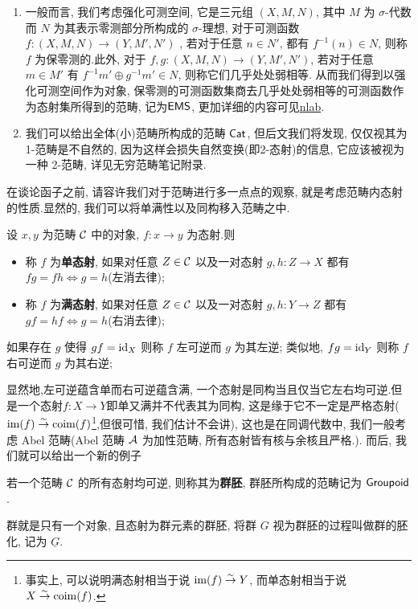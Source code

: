 \begin{example}
\begin{enumerate}
        \item 一般而言, 我们考虑强化可测空间, 它是三元组 $(X,M,N)$, 其中 $M$ 为 $\sigma$-代数而 $N$ 为其表示零测部分所构成的 $\sigma$-理想, 对于可测函数 $f : (X,M,N) \to (Y,M',N')$ , 若对于任意 $n\in N'$, 都有 $f^{-1}(n) \in N$, 则称 $f$ 为保零测的.此外, 对于 $f,g : (X,M,N) \to (Y,M',N')$, 若对于任意 $m\in M'$ 有 $f^{-1}m'\oplus g^{-1}m'\in N$, 则称它们几乎处处弱相等.
        从而我们得到以强化可测空间作为对象, 保零测的可测函数集商去几乎处处弱相等的可测函数作为态射集所得到的范畴, 记为$\mathsf{EMS}$, 更加详细的内容可见\href{https://ncatlab.org/nlab/show/categories+of+measure+theory}{nlab}.
        \item 我们可以给出全体(小)范畴所构成的范畴 $\mathsf{Cat}$, 但后文我们将发现, 仅仅视其为 1-范畴是不自然的, 因为这样会损失自然变换(即2-态射)的信息, 它应该被视为一种 2-范畴, 详见无穷范畴笔记附录.
    \end{enumerate}
\end{example}
在谈论函子之前, 请容许我们对于范畴进行多一点点的观察, 就是考虑范畴内态射的性质.显然的, 我们可以将单满性以及同构移入范畴之中.
\begin{definition}
    设 $x,y$ 为范畴 $\cal{C}$ 中的对象, $f:x \to y$ 为态射.则
    \begin{itemize}
        \item 称 $f$ 为\textbf{单态射}, 如果对任意 $Z\in \cal{C}$ 以及一对态射 $g,h : Z \to X$ 都有 $fg = fh \Leftrightarrow g=h$(左消去律);
        \item 称 $f$ 为\textbf{满态射}, 如果对任意 $Z \in \cal{C}$ 以及一对态射 $g,h : Y \to Z$ 都有 $gf = hf \Leftrightarrow g=h$(右消去律);
    \end{itemize}
    如果存在 $g$ 使得 $gf = \mathrm{id}_X$ 则称 $f$ 左可逆而 $g$ 为其左逆; 类似地, $fg = \mathrm{id}_Y$ 则称 $f$ 右可逆而 $g$ 为其右逆;
\end{definition}
显然地,左可逆蕴含单而右可逆蕴含满, 一个态射是同构当且仅当它左右均可逆.但是一个态射$f: X \to Y$即单又满并不代表其为同构, 这是缘于它不一定是严格态射($\operatorname{im}(f)\stackrel{\sim}{\rightarrow} \operatorname{coim}(f)$\footnote{事实上, 可以说明满态射相当于说 $\operatorname{im}(f) \stackrel{\sim}{\rightarrow} Y$, 而单态射相当于说 $X \stackrel{\sim}{\rightarrow} \operatorname{coim}(f)$.},但很可惜, 我们估计不会讲), 这也是在同调代数中, 我们一般考虑 Abel 范畴(Abel 范畴 $\cal{A}$ 为加性范畴, 所有态射皆有核与余核且严格.).
而后, 我们就可以给出一个新的例子
\begin{definition}[群胚]
    若一个范畴 $\cal{C}$ 的所有态射均可逆, 则称其为\textbf{群胚}, 群胚所构成的范畴记为 $\mathsf{Groupoid}$.
\end{definition}
\begin{example}
    群就是只有一个对象, 且态射为群元素的群胚, 将群 $G$ 视为群胚的过程叫做群的胚化, 记为 $\underline{G}$.
\end{example}
